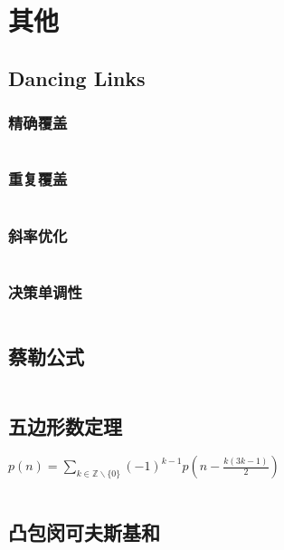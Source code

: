\section{其他}
\subsection{Dancing Links}
\subsubsection{精确覆盖}
\inputminted{cpp}{\source/others/exact.cpp}
\subsubsection{重复覆盖}
\inputminted{cpp}{\source/others/rader.cpp}
\subsubsection{斜率优化}
\inputminted{cpp}{\source/others/optimize.cpp}
\subsubsection{决策单调性}
\inputminted{cpp}{\source/others/dicision.cpp}
\subsection{蔡勒公式}
\inputminted{cpp}{\source/others/zellers-congruence.cpp}
\subsection{五边形数定理}
$p(n) = \sum_{k \in \mathbb{Z} \backslash \{0\}} (-1)^{k - 1}p(n - \frac{k(3k-1)}{2})$
\inputminted{cpp}{\source/others/partition.cpp}
\subsection{凸包闵可夫斯基和}
\inputminted{cpp}{\source/others/mink.cpp}
